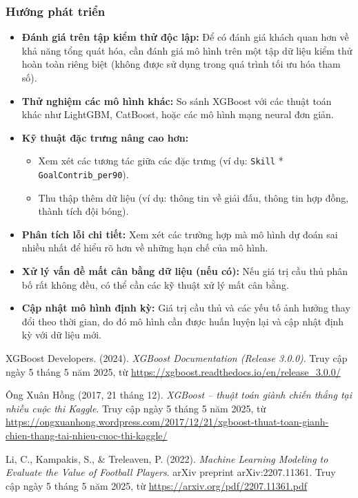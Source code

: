 \documentclass[12pt, a4paper]{report}
\begin{document}
\subsubsection*{Hướng phát triển}
\begin{itemize}
    \item \textbf{Đánh giá trên tập kiểm thử độc lập:} Để có đánh giá khách quan hơn về khả năng tổng quát hóa, cần đánh giá mô hình trên một tập dữ liệu kiểm thử hoàn toàn riêng biệt (không được sử dụng trong quá trình tối ưu hóa tham số).
    \item \textbf{Thử nghiệm các mô hình khác:} So sánh XGBoost với các thuật toán khác như LightGBM, CatBoost, hoặc các mô hình mạng neural đơn giản.
    \item \textbf{Kỹ thuật đặc trưng nâng cao hơn:}
    \begin{itemize}
        \item Xem xét các tương tác giữa các đặc trưng (ví dụ: \texttt{Skill} * \texttt{GoalContrib\_per90}).
        \item Thu thập thêm dữ liệu (ví dụ: thông tin về giải đấu, thông tin hợp đồng, thành tích đội bóng).
    \end{itemize}
    \item \textbf{Phân tích lỗi chi tiết:} Xem xét các trường hợp mà mô hình dự đoán sai nhiều nhất để hiểu rõ hơn về những hạn chế của mô hình.
    \item \textbf{Xử lý vấn đề mất cân bằng dữ liệu (nếu có):} Nếu giá trị cầu thủ phân bố rất không đều, có thể cần các kỹ thuật xử lý mất cân bằng.
    \item \textbf{Cập nhật mô hình định kỳ:} Giá trị cầu thủ và các yếu tố ảnh hưởng thay đổi theo thời gian, do đó mô hình cần được huấn luyện lại và cập nhật định kỳ với dữ liệu mới.
\end{itemize}


\begin{thebibliography}{99}
XGBoost Developers. (2024). \textit{XGBoost Documentation (Release 3.0.0)}. 
Truy cập ngày 5 tháng 5 năm 2025, từ \url{https://xgboost.readthedocs.io/en/release_3.0.0/}

Ông Xuân Hồng (2017, 21 tháng 12). \textit{XGBoost – thuật toán giành chiến thắng tại nhiều cuộc thi Kaggle}. 
Truy cập ngày 5 tháng 5 năm 2025, từ \url{https://ongxuanhong.wordpress.com/2017/12/21/xgboost-thuat-toan-gianh-chien-thang-tai-nhieu-cuoc-thi-kaggle/}

Li, C., Kampakis, S., \& Treleaven, P. (2022). \textit{Machine Learning Modeling to Evaluate the Value of Football Players}. 
arXiv preprint arXiv:2207.11361. Truy cập ngày 5 tháng 5 năm 2025, từ \url{https://arxiv.org/pdf/2207.11361.pdf}



\end{thebibliography}
\end{document}
